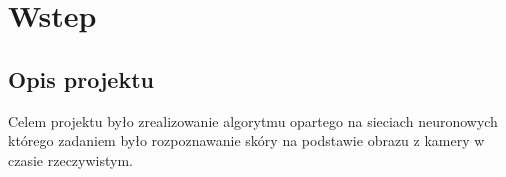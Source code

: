 \chapter{Wstep}
\label{cha:introduction}

\section{Opis projektu}
Celem projektu było zrealizowanie algorytmu opartego na sieciach neuronowych którego zadaniem było rozpoznawanie skóry na podstawie obrazu z kamery w czasie rzeczywistym. 


